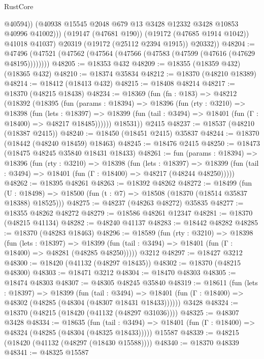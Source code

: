 \begin{lexlean}{RustCore}
\begin{coremodule}
                  @40594))
              (@40938 @15545 @2048 @679 @13 @3428 @12332 @3428 @10853 @40996 @41002)))
          (@19147 (@47681 @190))
          (@19172 (@47685 @1914 @1042))
          @41018
          @41037)
        @20319
        (@19172 (@25112 @2394 @1915))
        @20332))
@48204 := @47496 (@47521 (@47562 (@47564 (@47566 (@47583 (@47599 (@47616 (@47629 @48195))))))))
@48205 := @18353 @432
@48209 := @18355 (@18359 @432) (@18365 @432)
@48210 := @18374 @35834
@48212 := @18370 (@48210 @18389)
@48214 := @18412 (@18413 @432)
@48215 := @18408 @48214
@48217 := @18370 (@48215 @18438)
@48234 := @18369
    (fun (fn : @183) =>
    @48212
      (@18392
        (@18395
          (fun (params : @18394) =>
          @18396
            (fun (rty : @3210) =>
            @18398
              (fun (lets : @18397) =>
              @18399 (fun (tail : @3494) => @18401 (fun (Γ : @18400) => @48217 @18485))))))
        @18531))
    @2415
@48237 := @18537 (@48210 (@18387 @2415))
@48240 := @18450 (@18451 @2415) @35837
@48244 := @18370 (@18442 (@48240 @18459) @18463)
@48245 := @18476 @2415
@48250 := @18473 (@18475 @48245 @35840 @18431 @18433)
@48261 := fun (params : @18394) =>
  @18396
    (fun (rty : @3210) =>
    @18398
      (fun (lets : @18397) =>
      @18399 (fun (tail : @3494) => @18401 (fun (Γ : @18400) => @48217 (@48244 @48250)))))
@48262 := @18395 @48261
@48263 := @18392 @48262
@48272 := @18499
    (fun (U : @18498) => @18500 (fun (t : @7) => @18508 (@18370 (@18514 @35837 @18388) @18525)))
@48275 := @48237 (@48263 @48272) @35835
@48277 := @18355 @48262 @48272
@48279 := @18586 @48261 @12347
@48281 := @18370 (@48215 @41134)
@48282 := @48240 @41137
@48283 := @18442 @48282
@48285 := @18370 (@48283 @18463)
@48296 := @18589
    (fun (rty : @3210) =>
    @18398
      (fun (lets : @18397) =>
      @18399 (fun (tail : @3494) => @18401 (fun (Γ : @18400) => @48281 (@48285 @48250)))))
    @3212
@48297 := @18427 @3212
@48300 := @18420 (@41132 (@48297 @18435))
@48302 := @18370 (@48215 @48300)
@48303 := @18471 @3212
@48304 := @18470 @48303
@48305 := @18474 @48303
@48307 := @48305 @48245 @35840
@48319 := @18611
    (fun (lets : @18397) =>
    @18399
      (fun (tail : @3494) =>
      @18401 (fun (Γ : @18400) => @48302 (@48285 (@48304 (@48307 @18431 @18433))))))
    @3428
@48324 := @18370 (@48215 (@18420 (@41132 (@48297 @31036))))
@48325 := @48307 @3428
@48334 := @18635
    (fun (tail : @3494) => @18401 (fun (Γ : @18400) => @48324 (@48285 (@48304 (@48325 @18433)))))
    @15587
@48339 := @48215 (@18420 (@41132 (@48297 (@18430 @15588))))
@48340 := @18370 @48339
@48341 := @48325 @15587

\end{coremodule}
\end{lexlean}
